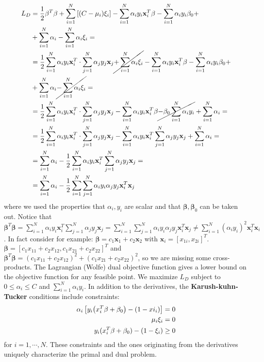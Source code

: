 \documentclass[12pt, letterpaper]{article}
\theoremstyle{definition}
\newcommand{\be}{\mathbf{\beta}}
\newcommand{\x}{\mathbf{x}}
\DeclarePairedDelimiter\autobracket{(}{)}
\newcommand{\br}[1]{\autobracket*{#1}}
\begin{document}
\begin{equation}
\begin{aligned}
L_D &= \frac{1}{2}\be^T\be + \sum_{i=1}^N \left[\br{C-\mu_i} \xi_i \right]- \sum_{i=1}^N \alpha_i y_i \x_i^T\beta- \sum_{i=1}^N \alpha_i y_i\beta_0+\\
&+ \sum_{i=1}^N \alpha_i-\sum_{i=1}^N \alpha_i\xi_i = \\
&=\frac{1}{2}\sum_{i=1}^N  \alpha_i y_i \x_i^T\cdot \sum_{j=1}^N  \alpha_j y_j \x_j \cancel{+ \sum_{i=1}^N \alpha_i \xi_i}- \sum_{i=1}^N \alpha_i y_i \x_i^T\beta- \sum_{i=1}^N \alpha_i y_i\beta_0+\\
&+ \sum_{i=1}^N \alpha_i\cancel{-\sum_{i=1}^N \alpha_i\xi_i} =\\
&=\frac{1}{2}\sum_{i=1}^N  \alpha_i y_i \x_i^T\cdot \sum_{j=1}^N  \alpha_j y_j \x_j- \sum_{i=1}^N \alpha_i y_i \x_i^T\beta \cancel{- \beta_0\sum_{i=1}^N \alpha_i y_i}+ \sum_{i=1}^N \alpha_i =\\
&=\frac{1}{2}\sum_{i=1}^N  \alpha_i y_i \x_i^T\cdot \sum_{j=1}^N  \alpha_j y_j \x_j- \sum_{i=1}^N \alpha_i y_i \x_i^T\sum_{j=1}^N \alpha_j y_j \x_j+ \sum_{i=1}^N \alpha_i =\\
&= \sum_{i=1}^N \alpha_i - \frac{1}{2}\sum_{i=1}^N \alpha_i y_i \x_i^T\sum_{j=1}^N \alpha_j y_j \x_j = \\
&= \sum_{i=1}^N \alpha_i - \frac{1}{2}\sum_{i=1}^N\sum_{j=1}^N \alpha_i y_i \alpha_j y_j\x_i^T  \x_j
\end{aligned}
\label{LagrangeDueal}
\end{equation}
where we used the properties that $\alpha_i, y_i$ are scalar and that $\be, \be_0$ can be taken out. Notice that $\be^T\be  = \sum_{i=1}^N \alpha_i y_i \x_i^T\sum_{j=1}^N\alpha_j y_j \x_j =\sum_{i=1}^N \sum_{j=1}^N \alpha_i y_i \alpha_j y_j  \x_i^T\x_j \ne \sum_{i=1}^N  (\alpha_i y_i)^2 \x_i^T\x_i$. In fact consider for example: $\be = c_1\x_1 + c_2\x_2$ with $\x_i = \left[x_{1i}, x_{2i}\right]^T$. $\be = \left[ c_1x_{11}+c_2x_{12}, c_1x_{21}+c_2x_{22} \right]^T$ and $\be^T\be = (c_1x_{11}+c_2x_{12})^2+(c_1x_{21}+c_2x_{22})^2$, so we are missing some cross-products. The Lagrangian (Wolfe) dual objective function gives a lower bound on the objective function for any feasible point. We maximize $L_D$ subject to $0\le \alpha_i\le C$ and $\sum_{i=1}^N\alpha_iy_i$. In addition to the derivatives, the \textbf{Karush-kuhn-Tucker} conditions include constraints:
\begin{equation}
\begin{aligned}
\alpha_i \left[ y_i\br{x_i^T\be+\be_0}-\br{1-xi_i}\right] &=0\\
\mu_i \xi_i &= 0\\
y_i(x_i^T\be+\be_0) - (1 - \xi_i) &\ge 0
\end{aligned}
\label{KKT}
\end{equation}
for $i=1,\cdots, N$. These constraints and the ones originating from the derivatives uniquely characterize the primal and dual problem.
\end{document}
